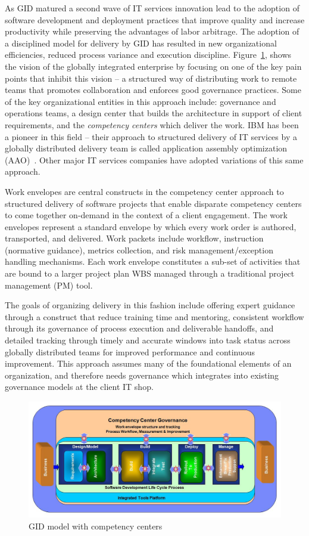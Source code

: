 As GID matured a second wave of IT services innovation lead to the adoption of software development and deployment practices that improve quality and increase productivity while preserving the advantages of labor arbitrage.  The adoption of a disciplined model for delivery by GID has resulted in new organizational efficiencies, reduced process variance and execution discipline. Figure~\ref{glofig1}, shows the vision of the globally integrated enterprise by focusing on one of the key pain points that inhibit this vision -- a structured way of distributing work to remote teams that promotes collaboration and enforces good governance practices.  Some of the key organizational entities in this approach include: governance and operations teams, a design center that builds the architecture in support of client requirements, and the \textit{competency centers} which deliver the work. IBM has been a pioneer in this field -- their approach to structured delivery of IT services by a globally distributed delivery team is called application assembly optimization (AAO)~\cite{gloaao}. Other major IT services companies have adopted variations of this same approach.

Work envelopes are central constructs in the competency center approach to structured delivery of software projects that enable disparate competency centers to come together on-demand in the context of a client engagement.  The work envelopes represent a standard envelope by which every work order is authored, transported, and delivered. Work packets include workflow, instruction (normative guidance), metrics collection, and risk management/exception handling mechanisms. Each work envelope constitutes a sub-set of activities that are bound to a larger project plan WBS managed through a traditional project management (PM) tool.

The goals of organizing delivery in this fashion include offering expert guidance through a construct that reduce training time and mentoring, consistent workflow through its governance of process execution and deliverable handoffs, and detailed tracking through timely and accurate windows into task status across globally distributed teams for improved performance and continuous improvement. This approach assumes many of the foundational elements of an organization, and therefore needs governance which integrates into existing governance models at the client IT shop.

\begin{figure}[H]
\centering
\includegraphics[bb= 0 0 850 400, scale=0.25]{figs/glocomp.jpg}
\caption{GID model with competency centers}
\label{glofig1}
\end{figure}


